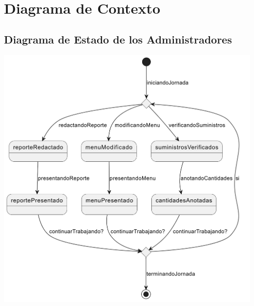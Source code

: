 \documentclass[12pt]{article}
\begin{document}
\pagebreak

\section{Diagrama de Contexto}

\subsection{Diagrama de Estado de los Administradores}

\vspace{1cm}

\begin{center}
	\includegraphics[width=15cm]{Domain Modeling [01] - Status Diagram: Administrators.png}
\end{center}
\end{document}
